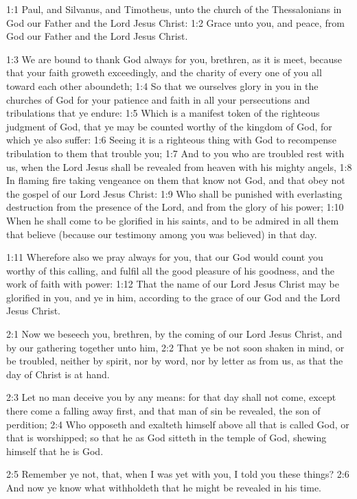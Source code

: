 

1:1 Paul, and Silvanus, and Timotheus, unto the church of the Thessalonians in God our Father and the Lord Jesus Christ: 1:2 Grace unto you, and peace, from God our Father and the Lord Jesus Christ.

1:3 We are bound to thank God always for you, brethren, as it is meet, because that your faith groweth exceedingly, and the charity of every one of you all toward each other aboundeth; 1:4 So that we ourselves glory in you in the churches of God for your patience and faith in all your persecutions and tribulations that ye endure: 1:5 Which is a manifest token of the righteous judgment of God, that ye may be counted worthy of the kingdom of God, for which ye also suffer: 1:6 Seeing it is a righteous thing with God to recompense tribulation to them that trouble you; 1:7 And to you who are troubled rest with us, when the Lord Jesus shall be revealed from heaven with his mighty angels, 1:8 In flaming fire taking vengeance on them that know not God, and that obey not the gospel of our Lord Jesus Christ: 1:9 Who shall be punished with everlasting destruction from the presence of the Lord, and from the glory of his power; 1:10 When he shall come to be glorified in his saints, and to be admired in all them that believe (because our testimony among you was believed) in that day.

1:11 Wherefore also we pray always for you, that our God would count you worthy of this calling, and fulfil all the good pleasure of his goodness, and the work of faith with power: 1:12 That the name of our Lord Jesus Christ may be glorified in you, and ye in him, according to the grace of our God and the Lord Jesus Christ.

2:1 Now we beseech you, brethren, by the coming of our Lord Jesus Christ, and by our gathering together unto him, 2:2 That ye be not soon shaken in mind, or be troubled, neither by spirit, nor by word, nor by letter as from us, as that the day of Christ is at hand.

2:3 Let no man deceive you by any means: for that day shall not come, except there come a falling away first, and that man of sin be revealed, the son of perdition; 2:4 Who opposeth and exalteth himself above all that is called God, or that is worshipped; so that he as God sitteth in the temple of God, shewing himself that he is God.

2:5 Remember ye not, that, when I was yet with you, I told you these things?  2:6 And now ye know what withholdeth that he might be revealed in his time.

